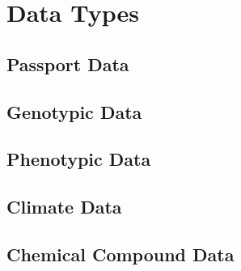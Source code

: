 \section{Data Types}

\subsection{Passport Data}

\subsection{Genotypic Data}

\subsection{Phenotypic Data}

\subsection{Climate Data}

\subsection{Chemical Compound Data}